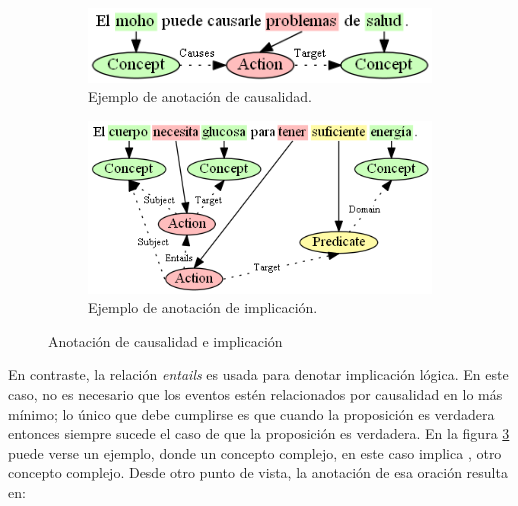 \begin{figure}[H]
	\centering
	\begin{subfigure}{3.25in}
		\includegraphics[width=\textwidth]{graphics/annotation_example_causes.png}
		\caption{Ejemplo de anotación de causalidad.}
		\vspace{0.4in}
		\label{fig:annotation_example_causes}
	\end{subfigure}
	\begin{subfigure}{3.9in}
		\includegraphics[width=\linewidth]{graphics/annotation_example_entails.png}
		\caption{Ejemplo de anotación de implicación.}
		\label{fig:annotation_example_entails}
	\end{subfigure}
	\caption{Anotación de causalidad e implicación}
\end{figure}

En contraste, la relación {\it entails} es usada para denotar implicación lógica. En este caso, no es necesario que los eventos estén relacionados por causalidad en lo más mínimo; lo único que debe cumplirse es que cuando la proposición  es verdadera entonces siempre sucede el caso de que la proposición  es verdadera. En la figura \ref{fig:annotation_example_entails} puede verse un ejemplo, donde un concepto complejo, en este caso  implica , otro concepto complejo. Desde otro punto de vista, la anotación de esa oración resulta en:

\begin{center}
\end{center}

